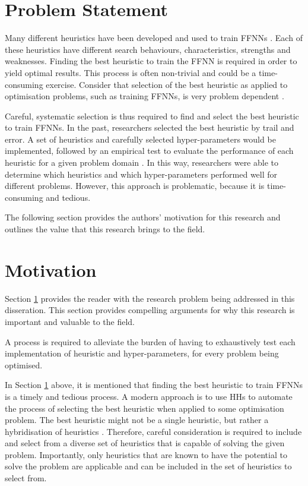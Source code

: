 \section{Problem Statement}\label{sec:introduction:problem}

Many different heuristics have been developed and used to train \acp{FFNN} \cite{ref:gudise:2003, ref:rakitianskaia:2012, ref:montana:1989}. Each of these heuristics have different search behaviours, characteristics, strengths and weaknesses. Finding the best heuristic to train the \ac{FFNN} is required in order to yield optimal results. This process is often non-trivial and could be a time-consuming exercise.  Consider that selection of the best heuristic as applied to optimisation problems, such as training \acp{FFNN}, is very problem dependent \cite{ref:allen:1996, ref:drake:2020, ref:pillay:2018}.

Careful, systematic selection is thus required to find and select the best heuristic to train \acp{FFNN}. In the past, researchers selected the best heuristic by trail and error. A set of heuristics and carefully selected hyper-parameters would be implemented, followed by an empirical test to evaluate the performance of each heuristic for a given problem domain \cite{ref:pillay:2015}. In this way, researchers were able to determine which heuristics and which hyper-parameters performed well for different problems. However, this approach is problematic, because it is time-consuming and tedious.

The following section provides the authors' motivation for this research and outlines the value that this research brings to the field.


\section{Motivation}\label{sec:introduction:motivation}

Section \ref{sec:introduction:problem} provides the reader with the research problem being addressed in this disseration. This section provides compelling arguments for why this research is important and valuable to the field.

A process is required to alleviate the burden of having to exhaustively test each implementation of heuristic and hyper-parameters, for every problem being optimised.

In Section \ref{sec:introduction:problem} above, it is mentioned that finding the best heuristic to train \acp{FFNN} is a timely and tedious process. A modern approach is to use \acp{HH} to automate the process of selecting the best heuristic when applied to some optimisation problem. The best heuristic might not be a single heuristic, but rather a hybridisation of heuristics \cite{ref:pillay:2015}. Therefore, careful consideration is required to include and select from a diverse set of heuristics that is capable of solving the given problem. Importantly, only heuristics that are known to have the potential to solve the problem are applicable and can be included in the set of heuristics to select from.

